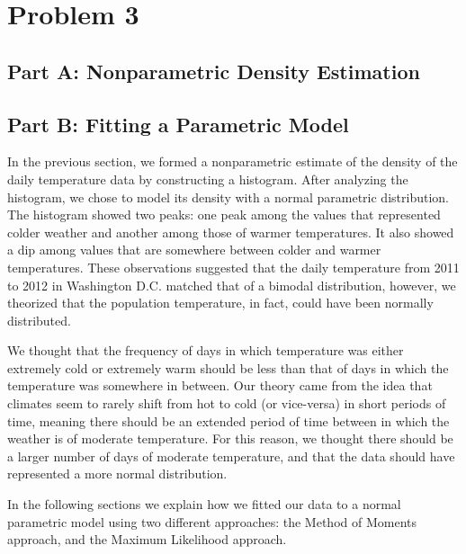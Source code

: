 \documentclass[11pt]{article}
\begin{document}
\section{Problem 3}
\label{sec:problem3}
\subsection{Part A: Nonparametric Density Estimation}
\label{subsec:3a}


\subsection{Part B: Fitting a Parametric Model}
\label{subsec:3b}
In the previous section, we formed a nonparametric estimate of the density of the daily temperature data by constructing a histogram. After analyzing the histogram, we chose to model its density with a normal parametric distribution. The histogram showed two peaks: one peak among the values that represented colder weather and another among those of warmer temperatures. It also showed a dip among values that are somewhere between colder and warmer temperatures. These observations suggested that the daily temperature from 2011 to 2012 in Washington D.C. matched that of a bimodal distribution, however, we theorized that the population temperature, in fact, could have been normally distributed.  

We thought that the frequency of days in which temperature was either extremely cold or extremely warm should be less than that of days in which the temperature was somewhere in between. Our theory came from the idea that climates seem to rarely shift from hot to cold (or vice-versa) in short periods of time, meaning there should be an extended period of time between in which the weather is of moderate temperature. For this reason, we thought there should be a larger number of days of moderate temperature, and that the data should have represented a more normal distribution. 

In the following sections we explain how we fitted our data to a normal parametric model using two different approaches: the Method of Moments approach, and the Maximum Likelihood approach. 
\end{document}
